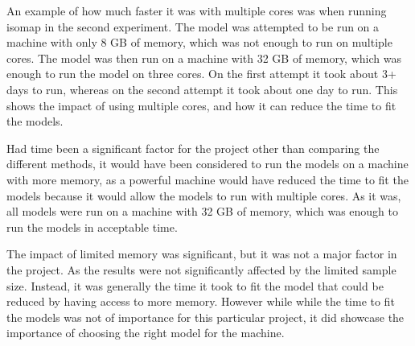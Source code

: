An example of how much faster it was with multiple cores was when running \gls{isomap} in the second experiment. The model was attempted to be run on a machine with only 8 GB of memory, which was not enough to run on multiple cores. The model was then run on a machine with 32 GB of memory, which was enough to run the model on three cores. On the first attempt it took about 3+ days to run, whereas on the second attempt it took about one day to run. This shows the impact of using multiple cores, and how it can reduce the time to fit the models.

Had time been a significant factor for the project other than comparing the different methods, it would have been considered to run the models on a machine with more memory, as a powerful machine would have reduced the time to fit the models because it would allow the models to run with multiple cores. As it was, all models were run on a machine with 32 GB of memory, which was enough to run the models in acceptable time.

The impact of limited memory was significant, but it was not a major factor in the project. As the results were not significantly affected by the limited sample size. Instead, it was generally the time it took to fit the model that could be reduced by having access to more memory. However while while the time to fit the models was not of importance for this particular project, it did showcase the importance of choosing the right model for the machine.
